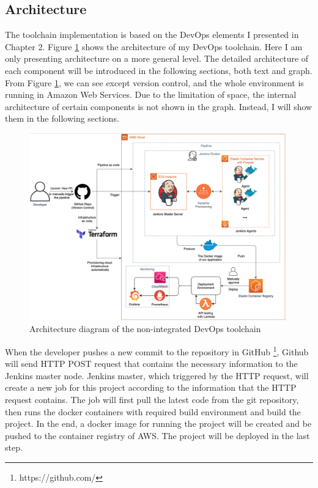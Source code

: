 \subsection{Architecture}
The toolchain implementation is based on the DevOps elements I presented in Chapter 2. Figure \ref{fig:archjenkins} shows the architecture of my DevOps toolchain. Here I am only presenting architecture on a more general level. The detailed architecture of each component will be introduced in the following sections, both text and graph. From Figure \ref{fig:archjenkins}, we can see except version control, and the whole environment is running in Amazon Web Services. Due to the limitation of space, the internal architecture of certain components is not shown in the graph. Instead, I will show them in the following sections.
\begin{figure}[!h]
     \centering
     \includegraphics[width=0.99\textwidth]{pics/arch-med-jenkins.png}
     \caption{Architecture diagram of the non-integrated DevOps toolchain}
     \label{fig:archjenkins}
\end{figure}
\par
When the developer pushes a new commit to the repository in GitHub \footnote{https://github.com/}, Github will send HTTP POST request that contains the necessary information to the Jenkins master node. Jenkins master, which triggered by the HTTP request, will create a new job for this project according to the information that the HTTP request contains. The job will first pull the latest code from the git repository, then runs the docker containers with required build environment and build the project. In the end, a docker image for running the project will be created and be pushed to the container registry of AWS. The project will be deployed in the last step.
